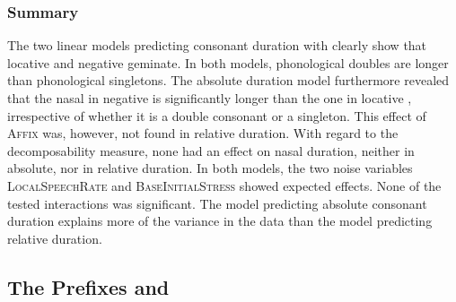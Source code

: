 \subsubsection{Summary}


The two linear models predicting consonant duration with  clearly show that locative and negative  geminate. In both models, phonological doubles are longer than phonological singletons. 
The absolute duration model furthermore revealed that the nasal in negative  is significantly longer than the one in locative , irrespective of whether it is a double consonant or a singleton. This effect of \textsc{Affix} was, however, not found in relative duration.
With regard to the decomposability measure, none had an effect on nasal duration, neither in absolute, nor in relative duration. 
In both models, the two noise variables \textsc{LocalSpeechRate} and \textsc{BaseInitialStress} showed expected effects. None of the tested interactions was significant. 
The model predicting absolute consonant duration explains more of the variance in the data than the model predicting relative duration. 



\subsection{The Prefixes  and } \label{corpus un in}


